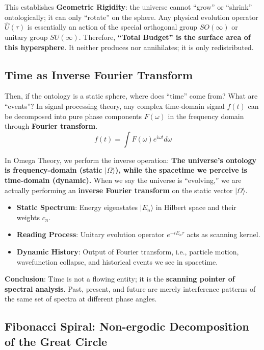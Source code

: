 This establishes \textbf{Geometric Rigidity}: the universe cannot ``grow'' or ``shrink'' ontologically; it can only ``rotate'' on the sphere. Any physical evolution operator $\hat{U}(\tau)$ is essentially an action of the special orthogonal group $SO(\infty)$ or unitary group $SU(\infty)$.
Therefore, \textbf{``Total Budget'' is the surface area of this hypersphere}. It neither produces nor annihilates; it is only redistributed.

\subsection{Time as Inverse Fourier Transform}

Then, if the ontology is a static sphere, where does ``time'' come from? What are ``events''?
In signal processing theory, any complex time-domain signal $f(t)$ can be decomposed into pure phase components $F(\omega)$ in the frequency domain through \textbf{Fourier transform}.
\[f(t) = \int F(\omega) e^{i\omega t} d\omega\]

In Omega Theory, we perform the inverse operation: \textbf{The universe's ontology is frequency-domain (static $|\Omega\rangle$), while the spacetime we perceive is time-domain (dynamic).}
When we say the universe is ``evolving,'' we are actually performing an \textbf{inverse Fourier transform} on the static vector $|\Omega\rangle$.

\begin{itemize}
\item \textbf{Static Spectrum}: Energy eigenstates $|E_n\rangle$ in Hilbert space and their weights $c_n$.
\item \textbf{Reading Process}: Unitary evolution operator $e^{-i E_n \tau}$ acts as scanning kernel.
\item \textbf{Dynamic History}: Output of Fourier transform, i.e., particle motion, wavefunction collapse, and historical events we see in spacetime.
\end{itemize}

\textbf{Conclusion}: Time is not a flowing entity; it is the \textbf{scanning pointer of spectral analysis}. Past, present, and future are merely interference patterns of the same set of spectra at different phase angles.

\subsection{Fibonacci Spiral: Non-ergodic Decomposition of the Great Circle}

